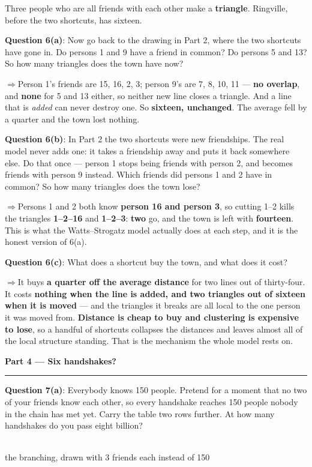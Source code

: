 \documentclass[a4paper, 11pt]{extarticle}
\newcommand{\parthead}[2]{%
  \vspace{0.5em}
  {\large\bfseries Part #1 --- #2}\par
  \vspace{-0.4em}\rule{\textwidth}{0.8pt}\par
  \vspace{0.2em}}
\newcommand{\ans}[1]{\textbf{\textcolor{pltblue!75!black}{#1}}}
\newcommand{\arrow}{\textcolor{pltblue!75!black}{$\Rightarrow$}\;}
\begin{document}
Three people who are all friends with each other make a \textbf{triangle}.
Ringville, before the two shortcuts, has sixteen.

{\bf Question 6(a)}: Now go back to the drawing in Part 2, where the two
shortcuts have gone in. Do persons 1 and 9 have a friend in common? Do persons
5 and 13? So how many triangles does the town have now?

\arrow Person 1's friends are 15, 16, 2, 3; person 9's are 7, 8, 10, 11 ---
\ans{no overlap}, and \ans{none} for 5 and 13 either, so neither new line
closes a triangle. And a line that is \emph{added} can never destroy one. So
\ans{sixteen, unchanged}. The average fell by a quarter and the town lost
nothing.

{\bf Question 6(b)}: In Part 2 the two shortcuts were new friendships. The real
model never adds one: it takes a friendship away and puts it back somewhere
else. Do that once --- person 1 stops being friends with person 2, and becomes
friends with person 9 instead. Which friends did persons 1 and 2 have in
common? So how many triangles does the town lose?

\arrow Persons 1 and 2 both know \ans{person 16 and person 3}, so cutting
1--2 kills the triangles \ans{1--2--16} and \ans{1--2--3}: \ans{two} go, and
the town is left with \ans{fourteen}. This is what the Watts--Strogatz model
actually does at each step, and it is the honest version of 6(a).

{\bf Question 6(c)}: What does a shortcut buy the town, and what does it cost?

\arrow It buys \ans{a quarter off the average distance} for two lines out of
thirty-four. It costs \ans{nothing when the line is added, and two triangles
out of sixteen when it is moved} --- and the triangles it breaks are all local
to the one person it was moved from. \ans{Distance is cheap to buy and
clustering is expensive to lose}, so a handful of shortcuts collapses the
distances and leaves almost all of the local structure standing. That is the
mechanism the whole model rests on.

\parthead{4}{Six handshakes?}

{\bf Question 7(a)}: Everybody knows 150 people. Pretend for a moment that no
two of your friends know each other, so every handshake reaches 150 people
nobody in the chain has met yet. Carry the table two rows further. At how many
handshakes do you pass eight billion?

\begin{center}
\resizebox{0.40\textwidth}{!}{\reachtree}\\[0.3em]
{\footnotesize the branching, drawn with 3 friends each instead of 150}
\end{center}
\end{document}
